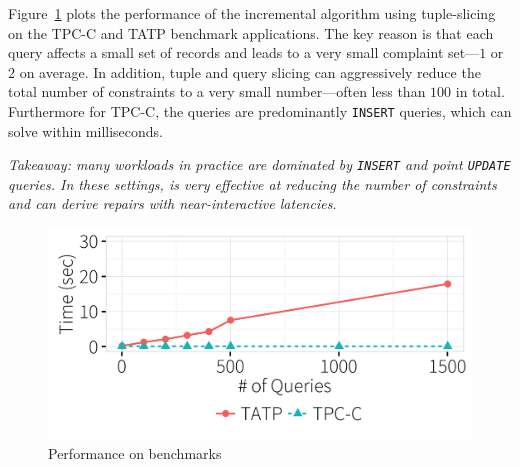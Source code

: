 Figure~\ref{f:tpcctatp} plots the performance of the incremental algorithm using tuple-slicing on the TPC-C and TATP benchmark applications.  
The key reason is that each query affects a small set of records and leads to a very small complaint set---$1$ or $2$ on average.
In addition, tuple and query slicing can aggressively reduce the total number of constraints to a very small number---often less than $100$ in total.
Furthermore for TPC-C, the queries are predominantly \texttt{INSERT} queries, which \sys can solve within milliseconds.

{\it Takeaway: many workloads in practice are dominated by \texttt{INSERT} and point \texttt{UPDATE} queries.  
  In these settings, \sys is very effective at reducing the number of constraints and can derive repairs with near-interactive latencies.}
\begin{figure}[h]
\centering
  \includegraphics[width = .75\columnwidth]{figures/benchmark_time}
  \vspace*{-.2in}
  \caption{Performance on benchmarks}
  \label{f:tpcctatp} 
  \vspace*{-.1in}
\end{figure}

